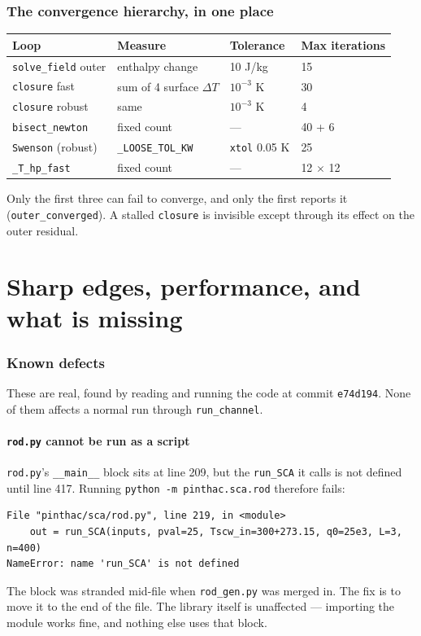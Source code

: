 \documentclass[11pt]{article}
\newcommand{\code}[1]{\texttt{#1}}
\begin{document}
\section{The convergence hierarchy, in one place}

\begin{center}
\begin{tabular}{llll}
\toprule
Loop & Measure & Tolerance & Max iterations \\
\midrule
\code{solve\_field} outer & enthalpy change & 10 J/kg & 15 \\
\code{closure} fast & sum of 4 surface $\Delta T$ & $10^{-3}$ K & 30 \\
\code{closure} robust & same & $10^{-3}$ K & 4 \\
\code{bisect\_newton} & fixed count & --- & 40 + 6 \\
\code{Swenson} (robust) & \code{\_LOOSE\_TOL\_KW} & \code{xtol} 0.05 K & 25 \\
\code{\_T\_hp\_fast} & fixed count & --- & 12 $\times$ 12 \\
\bottomrule
\end{tabular}
\end{center}

Only the first three can fail to converge, and only the first reports it
(\code{outer\_converged}). A stalled \code{closure} is invisible except through its
effect on the outer residual.

\newpage
\part{Sharp edges, performance, and what is missing}

\section{Known defects}

These are real, found by reading and running the code at commit \code{e74d194}. None of
them affects a normal run through \code{run\_channel}.

\subsection{\code{rod.py} cannot be run as a script}
\code{rod.py}'s \code{\_\_main\_\_} block sits at line 209, but the \code{run\_SCA} it
calls is not defined until line 417. Running \code{python -m pinthac.sca.rod} therefore
fails:
\begin{lstlisting}
File "pinthac/sca/rod.py", line 219, in <module>
    out = run_SCA(inputs, pval=25, Tscw_in=300+273.15, q0=25e3, L=3, n=400)
NameError: name 'run_SCA' is not defined
\end{lstlisting}
The block was stranded mid-file when \code{rod\_gen.py} was merged in. The fix is to move
it to the end of the file. The library itself is unaffected --- importing the module works
fine, and nothing else uses that block.
\end{document}
